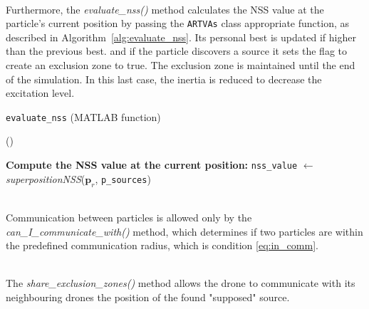 \documentclass[main]{subfiles}
\begin{document}
\noindent\\
Furthermore, the \textit{evaluate\_nss()} method calculates the 
NSS value at the particle's current position by passing the 
\texttt{ARTVAs} class appropriate function, as described 
in Algorithm~\ref{alg:evaluate_nss}.
Its personal best is updated if higher than the previous best. 
and if the particle discovers a source  
it sets the flag to create an exclusion zone to true.
The exclusion zone is maintained until the end 
of the simulation. 
In this last case, the inertia is reduced to decrease 
the excitation level.
\begin{algorithm}
     \caption{\texttt{evaluate\_nss} (MATLAB function)}\label{alg:evaluate_nss}
     \vspace{0.3\baselineskip}
     \nonl \Fn(\tcc*[h]{}){}{
        \SetAlgoBlockMarkers{}{}
        \DontPrintSemicolon \nonl \textbf{Compute the NSS value at the current position:}\;\PrintSemicolon
        \texttt{nss\_value} $\gets$ \textit{superpositionNSS}($\mathbf{p}_r$, \texttt{p\_sources})\;

 }
 \end{algorithm}

\noindent\\
Communication between particles is allowed only by the 
\textit{can\_I\_communicate\_with()} method, which 
determines if two particles are within the predefined 
communication radius, which is condition \ref{eq:in_comm}.

\noindent\\
The \textit{share\_exclusion\_zones()} 
method allows the drone to communicate with its 
neighbouring drones the position 
of the found "supposed" source.
\end{document}
